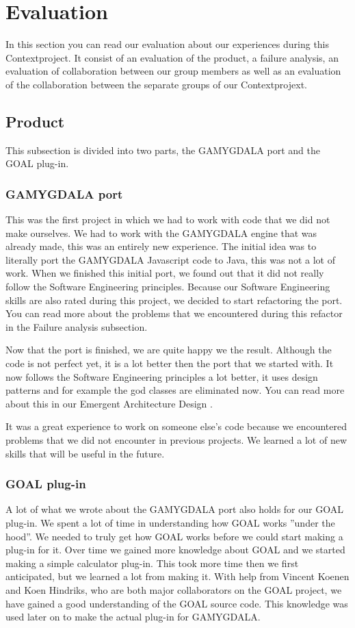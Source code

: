 \section{Evaluation}
In this section you can read our evaluation about our experiences during this Contextproject. It consist of an evaluation of the product, a failure analysis, an evaluation of collaboration between our group members as well as an evaluation of the collaboration between the separate groups of our Contextprojext.

\subsection{Product}
This subsection is divided into two parts, the GAMYGDALA port and the GOAL plug-in.

\subsubsection{GAMYGDALA port}
This was the first project in which we had to work with code that we did not make ourselves. We had to work with the GAMYGDALA engine that was already made, this was an entirely new experience. The initial idea was to literally port the GAMYGDALA Javascript code to Java, this was not a lot of work. When we finished this initial port, we found out that it did not really follow the Software Engineering principles. Because our Software Engineering skills are also rated during this project, we decided to start refactoring the port. You can read more about the problems that we encountered during this refactor in the Failure analysis subsection. \par
Now that the port is finished, we are quite happy we the result. Although the code is not perfect yet, it is a lot better then the port that we started with. It now follows the Software Engineering principles a lot better, it uses design patterns and for example the god classes are eliminated now. You can read more about this in our Emergent Architecture Design \citep{ead}. \par
It was a great experience to work on someone else's code because we encountered problems that we did not encounter in previous projects. We learned a  lot of new skills that will be useful in the future.

\subsubsection{GOAL plug-in}
A lot of what we wrote about the GAMYGDALA port also holds for our GOAL plug-in. We spent a lot of time in understanding how GOAL works ''under the hood''. We needed to truly get how GOAL works before we could start making a plug-in for it. Over time we gained more knowledge about GOAL and we started making a simple calculator plug-in. This took more time then we first anticipated, but we learned a lot from making it. With help from Vincent Koenen and Koen Hindriks, who are both major collaborators on the GOAL project, we have gained a good understanding of the GOAL source code. This knowledge was used later on to make the actual plug-in for GAMYGDALA.

